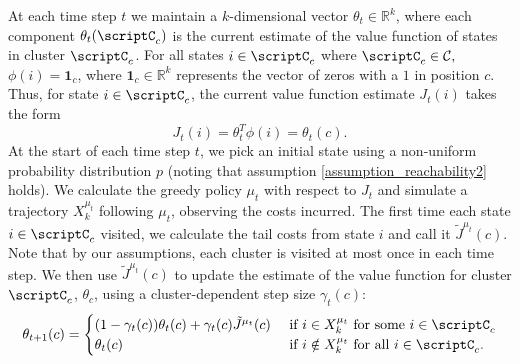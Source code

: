 \documentclass[12pt]{article}
\begin{document}
At each time step $t$ we maintain a $k$-dimensional vector $\theta_t \in \mathbb{R}^k$, where each component $\theta_t(\scriptC_c )$ is the current estimate of the value function of states in cluster $\scriptC_c $. For all states $i \in \scriptC_c$ where $\scriptC_c  \in \mathcal{C},$ $\phi(i)=\mathbf{1}_c$, where $\mathbf{1}_c \in \mathbb{R}^k$ represents the vector of zeros with a $1$ in position $c$. Thus, for state $i \in \scriptC_c$, the current value function estimate $J_t(i)$ takes the form 
\begin{equation}
J_t(i) = \theta_t^T\phi(i)=\theta_t(c). \label{Jt_up_agg}
\end{equation}%
At the start of each time step $t$, we pick an initial state using a non-uniform probability distribution $p$ (noting that assumption \ref{assumption_reachability2} holds). We calculate the greedy policy $\mu_t$ with respect to $J_t$ and simulate a trajectory $X^{\mu_t}_k$ following $\mu_t$, observing the costs incurred. The first time each state $i\in \scriptC_c $ visited, we calculate the tail costs from state $i$ and call it $\tilde{J}^{\mu_t}(c)$. Note that by our assumptions, each cluster is visited at most once in each time step. We then use $\tilde{J}^{\mu_t}(c)$ to update the estimate of the value function for cluster $\scriptC_c $,  $\theta_c$, using a cluster-dependent step size $\gamma_t(c)$:
\begin{equation}
\theta_{t+1}(c) =  
\begin{cases}
(1-\gamma_t(c))\theta_t(c) + \gamma_t(c)\tilde{J}^{\mu_t}(c) & \text{ if $i \in X_k^{\mu_t} $ for some $i \in \scriptC_c$}\\
\theta_t(c) & \text{ if $i \notin X_k^{\mu_t}$ for all $i \in \scriptC_c$}.
\end{cases} \label{eq:updateagg}
\end{equation}
\end{document}
